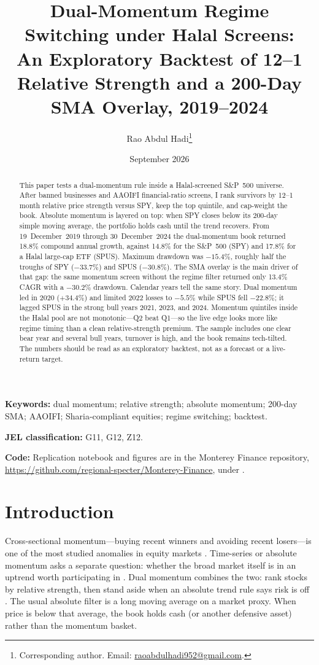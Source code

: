 \documentclass[11pt,letterpaper]{article}
\title{\textbf{Dual-Momentum Regime Switching under Halal Screens:\\
An Exploratory Backtest of 12--1 Relative Strength and a 200-Day SMA Overlay, 2019--2024}}
\author[1]{Rao Abdul Hadi\thanks{Corresponding author. Email: \href{mailto:raoabdulhadi952@gmail.com}{raoabdulhadi952@gmail.com}.}}
\affil[1]{Monterey Finance, Halal Quant Research Lab}
\date{September 2026}
\begin{document}
\maketitle

\begin{abstract}
\noindent
This paper tests a dual-momentum rule inside a Halal-screened S\&P~500 universe. After banned businesses and AAOIFI financial-ratio screens, I rank survivors by 12--1 month relative price strength versus SPY, keep the top quintile, and cap-weight the book. Absolute momentum is layered on top: when SPY closes below its 200-day simple moving average, the portfolio holds cash until the trend recovers. From 19~December~2019 through 30~December~2024 the dual-momentum book returned 18.8\% compound annual growth, against 14.8\% for the S\&P~500 (SPY) and 17.8\% for a Halal large-cap ETF (SPUS). Maximum drawdown was $-15.4\%$, roughly half the troughs of SPY ($-33.7\%$) and SPUS ($-30.8\%$). The SMA overlay is the main driver of that gap: the same momentum screen without the regime filter returned only 13.4\% CAGR with a $-30.2\%$ drawdown. Calendar years tell the same story. Dual momentum led in 2020 ($+34.4\%$) and limited 2022 losses to $-5.5\%$ while SPUS fell $-22.8\%$; it lagged SPUS in the strong bull years 2021, 2023, and 2024. Momentum quintiles inside the Halal pool are not monotonic---Q2 beat Q1---so the live edge looks more like regime timing than a clean relative-strength premium. The sample includes one clear bear year and several bull years, turnover is high, and the book remains tech-tilted. The numbers should be read as an exploratory backtest, not as a forecast or a live-return target.
\end{abstract}

\noindent\textbf{Keywords:}
dual momentum; relative strength; absolute momentum; 200-day SMA; AAOIFI; Sharia-compliant equities; regime switching; backtest.

\noindent\textbf{JEL classification:} G11, G12, Z12.

\noindent\textbf{Code:}
Replication notebook and figures are in the Monterey Finance repository,
\url{https://github.com/regional-specter/Monterey-Finance},
under .

\section{Introduction}

Cross-sectional momentum---buying recent winners and avoiding recent losers---is one of the most studied anomalies in equity markets \citep{jegadeesh1993,asness2013}. Time-series or absolute momentum asks a separate question: whether the broad market itself is in an uptrend worth participating in \citep{moskowitz2012}. Dual momentum combines the two: rank stocks by relative strength, then stand aside when an absolute trend rule says risk is off \citep{antonacci2014}. The usual absolute filter is a long moving average on a market proxy. When price is below that average, the book holds cash (or another defensive asset) rather than the momentum basket.
\end{document}
